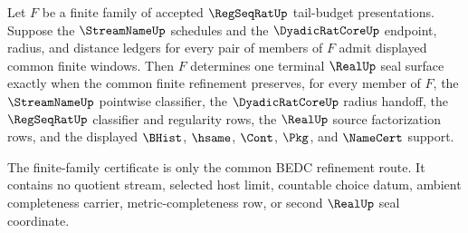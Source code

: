 \begin{theorem}
\label{thm:regseqrat-finite-tail-budget-family-common-refinement}
Let $F$ be a finite family of accepted $\RegSeqRatUp$ tail-budget
presentations. Suppose the $\StreamNameUp$ schedules and the
$\DyadicRatCoreUp$ endpoint, radius, and distance ledgers for every pair of
members of $F$ admit displayed common finite windows. Then $F$ determines one
terminal $\RealUp$ seal surface exactly when the common finite refinement
preserves, for every member of $F$, the $\StreamNameUp$ pointwise classifier,
the $\DyadicRatCoreUp$ radius handoff, the $\RegSeqRatUp$ classifier and
regularity rows, the $\RealUp$ source factorization rows, and the displayed
$\BHist$, $\hsame$, $\Cont$, $\Pkg$, and $\NameCert$ support.

The finite-family certificate is only the common BEDC refinement route. It
contains no quotient stream, selected host limit, countable choice datum,
ambient completeness carrier, metric-completeness row, or second $\RealUp$
seal coordinate.
\end{theorem}
